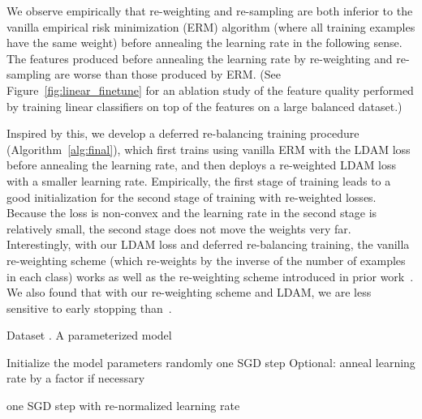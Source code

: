 \documentclass{article}
\newcommand{\lda}{\ldam}
\newcommand{\ldam}{\textup{LDAM}}
\begin{document}
We observe empirically that re-weighting and re-sampling are both inferior to the vanilla empirical risk minimization (ERM) algorithm (where all training examples have the same weight) before annealing the learning rate in the following sense. The features produced before annealing the learning rate by re-weighting and re-sampling are worse than those produced by ERM. (See Figure~\ref{fig:linear_finetune} for an ablation study of the feature quality performed by training linear classifiers on top of the features on a large balanced dataset.) 


Inspired by this, we develop a deferred re-balancing training procedure (Algorithm~\ref{alg:final}), which first trains using vanilla ERM with the \lda{} loss before annealing the learning rate, and then deploys a re-weighted \lda{} loss with a smaller learning rate. Empirically, the first stage of training leads to a good initialization for the second stage of training with re-weighted losses. Because the loss is non-convex and the learning rate in the second stage is relatively small, the second stage does not move the weights very far. Interestingly, with our \lda{} loss and deferred re-balancing training, the vanilla re-weighting scheme (which re-weights by the inverse of the number of examples in each class) works as well as the re-weighting scheme introduced in prior work~\citep{cui2019classbalancedloss}. We also found that with our re-weighting scheme and LDAM, we are less sensitive to early stopping than~\citep{cui2019classbalancedloss}.




\newcommand{\cD}{\mathcal{D}}
\newcommand{\cB}{\mathcal{B}}

\begin{algorithm}[H]
\caption{Deferred Re-balancing Optimization with \lda{} Loss} \label{alg:final}
\begin{algorithmic}[1]

\Require Dataset . A parameterized model 

\State Initialize the model parameters  randomly
	\State    {}
    \State  
    \State  \Comment one SGD step
    \State Optional:   \Comment anneal learning rate by a factor  if necessary
\EndFor

\State


	\State    {}
       \State  {}
    \State  \Comment one SGD step with re-normalized learning rate
\EndFor
\end{algorithmic}
\end{algorithm}
\end{document}
